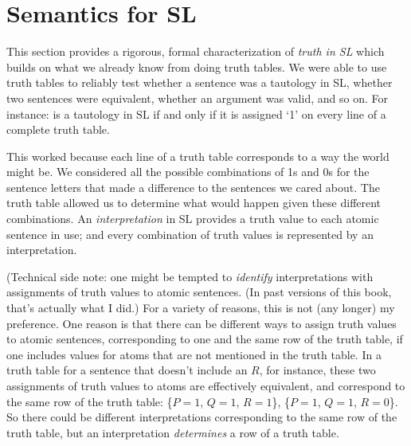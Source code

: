 

\section{Semantics for SL}
\label{sec.semanticsSL}

This section provides a rigorous, formal characterization of \emph{truth in SL} which builds on what we already know from doing truth tables. We were able to use truth tables to reliably test whether a sentence was a tautology in SL, whether two sentences were equivalent, whether an argument was valid, and so on. For instance: \metaA{} is a tautology in SL if and only if it is assigned `1' on every line of a complete truth table.

This worked because each line of a truth table corresponds to a way the world might be. We considered all the possible combinations of 1s and 0s for the sentence letters that made a difference to the sentences we cared about. The truth table allowed us to determine what would happen given these different combinations. An \emph{interpretation} in SL provides a truth value to each atomic sentence in use; and every combination of truth values is represented by an interpretation.

(Technical side note: one might be tempted to \emph{identify} interpretations with assignments of truth values to atomic sentences. (In past versions of this book, that's actually what I did.) For a variety of reasons, this is not (any longer) my preference. One reason is that there can be different ways to assign truth values to atomic sentences, corresponding to one and the same row of the truth table, if one includes values for atoms that are not mentioned in the truth table. In a truth table for a sentence that doesn't include an $R$, for instance, these two assignments of truth values to atoms are effectively equivalent, and correspond to the same row of the truth table: \{$P=1$, $Q=1$, $R=1$\}, \{$P=1$, $Q=1$, $R=0$\}. So there could be different interpretations corresponding to the same row of the truth table, but an interpretation \emph{determines} a row of a truth table.

